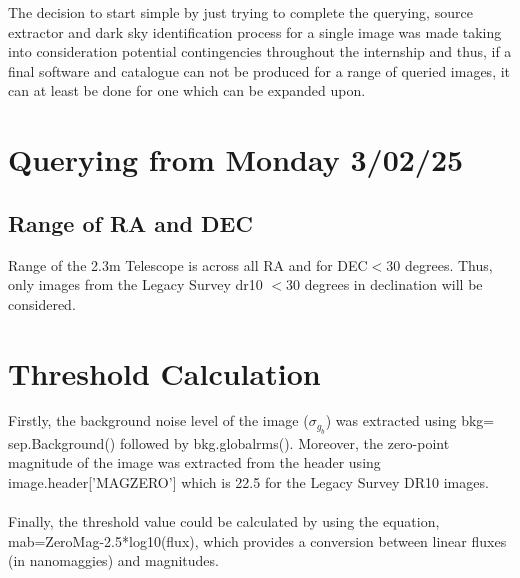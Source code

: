 \documentclass{article}
\begin{document}
The decision to start simple by just trying to complete the querying, source extractor and dark sky identification process for a single image was made taking into consideration potential contingencies throughout the internship and thus, if a final software and catalogue can not be produced for a range of queried images, it can at least be done for one which can be expanded upon.

\section{Querying from Monday 3/02/25}
\subsection{Range of RA and DEC}
Range of the 2.3m Telescope is across all RA and for DEC$<$30 degrees. 
Thus, only images from the Legacy Survey dr10 $<$30 degrees in declination will be considered.

\section{Threshold Calculation}
Firstly, the background noise level of the image ($\sigma_g_b$) was extracted using bkg= sep.Background() followed by bkg.globalrms(). Moreover, the zero-point magnitude of the image was extracted from the header using image.header['MAGZERO'] which is 22.5 for the Legacy Survey DR10 images. \\
\\Finally, the threshold value could be calculated by using the equation, mab=ZeroMag-2.5*log10(flux), 
which provides a conversion between linear fluxes (in nanomaggies) and magnitudes.  
\end{document}
